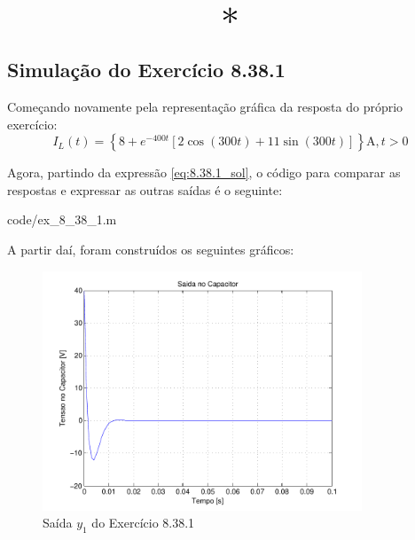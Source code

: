 \documentclass{report}
\begin{document}
\begin{center}
    \[ \scalebox{3}{$ * $} \]
\end{center}

\subsection{Simulação do Exercício 8.38.1}
Começando novamente pela representação gráfica da resposta do próprio exercício:
$$ I_L(t) = \left\{8 + e^{-400t}\left[2\cos(300t) + 11\sin(300t)\right]\right\}\text{A}, t > 0 $$

Agora, partindo da expressão \ref{eq:8.38.1_sol}, o código para comparar as respostas e expressar as outras saídas é o seguinte:

                {code/ex_8_38_1.m}

A partir daí, foram construídos os seguintes gráficos:
\begin{figure}[h!]
    \centering
    \includegraphics[width=0.85\textwidth]{images/plots/plot_8_38_1_y1.pdf}
    \caption{\label{plot:8.38.1_y1} Saída $ y_1 $ do Exercício 8.38.1}
\end{figure}
\end{document}
